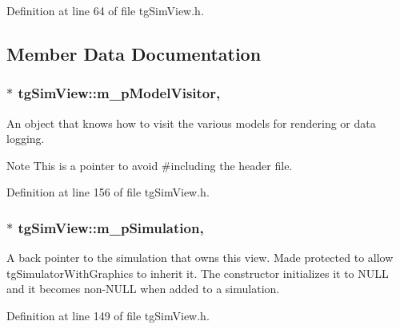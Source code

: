 Definition at line 64 of file tg\-Sim\-View.\-h.



\subsection{Member Data Documentation}
\hypertarget{classtg_sim_view_a4f19b09ac8cc273071fb5f7ff5e59a6b}{
\subsubsection[{m\-\_\-p\-Model\-Visitor}]{$\ast$ tg\-Sim\-View\-::m\-\_\-p\-Model\-Visitor\hspace{0.3cm}{\ttfamily [protected]}, {\ttfamily [inherited]}}}\label{classtg_sim_view_a4f19b09ac8cc273071fb5f7ff5e59a6b}
An object that knows how to visit the various models for rendering or data logging. \begin{DoxyNote}{Note}
This is a pointer to avoid \#including the header file. 
\end{DoxyNote}


Definition at line 156 of file tg\-Sim\-View.\-h.

\hypertarget{classtg_sim_view_a5e1b7f8fee44f02f76f8b32e3bd49d81}{
\subsubsection[{m\-\_\-p\-Simulation}]{$\ast$ tg\-Sim\-View\-::m\-\_\-p\-Simulation\hspace{0.3cm}{\ttfamily [protected]}, {\ttfamily [inherited]}}}\label{classtg_sim_view_a5e1b7f8fee44f02f76f8b32e3bd49d81}
A back pointer to the simulation that owns this view. Made protected to allow tg\-Simulator\-With\-Graphics to inherit it. The constructor initializes it to N\-U\-L\-L and it becomes non-\/\-N\-U\-L\-L when added to a simulation. 

Definition at line 149 of file tg\-Sim\-View.\-h.

